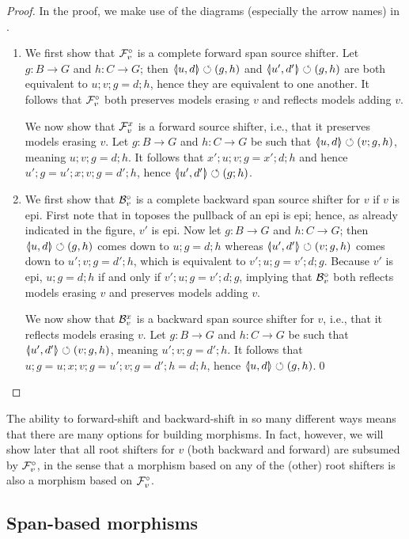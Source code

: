 \begin{proof}
In the proof, we make use of the diagrams (especially the arrow names) in .
\begin{enumerate}
\item We first show that $\mathcal{F}_v^\circ$ is a complete forward span source shifter. Let $g:B\to G$ and $h:C\to G$; then $\spanof{u}{d}\commutes (g,h)$ and $\spanof{u'}{d'}\commutes (g,h)$ are both equivalent to $u;v;g=d;h$, hence they are equivalent to one another. It follows that $\mathcal{F}_v^\circ$ both  preserves models erasing $v$ and reflects models adding $v$.

We now show that $\mathcal{F}_v^x$ is a forward source shifter, i.e., that it preserves models erasing $v$. Let $g:B\to G$ and $h:C\to G$ be such that $\spanof{u}{d}\commutes (v;g,h)$, meaning $u;v;g=d;h$. It follows that $x';u;v;g=x';d;h$ and hence $u';g=u';x;v;g=d';h$, hence $\spanof{u'}{d'}\commutes (g;h)$.

\item We first show that $\mathcal{B}_v^\circ$ is a complete backward span source shifter for $v$ if $v$ is epi. First note that in toposes the pullback of an epi is epi; hence, as already indicated in the figure, $v'$ is epi. Now let $g:B\to G$ and $h:C\to G$; then $\spanof{u}{d}\commutes (g,h)$ comes down to $u;g=d;h$ whereas $\spanof{u'}{d'}\commutes (v;g,h)$ comes down to $u';v;g=d';h$, which is equivalent to $v';u;g=v';d;g$. Because $v'$ is epi, $u;g=d;h$ if and only if $v';u;g=v';d;g$, implying that $\mathcal{B}_v^\circ$ both reflects models erasing $v$ and preserves models adding $v$.

We now show that $\mathcal{B}_v^x$ is a backward span source shifter for $v$, i.e., that it reflects models erasing $v$. Let $g:B\to G$ and $h:C\to G$ be such that $\spanof{u'}{d'}\commutes (v;g,h)$, meaning $u';v;g=d';h$. It follows that $u;g=u;x;v;g=u';v;g=d';h=d;h$, hence $\spanof u d\commutes (g,h)$.\qed
\end{enumerate}
\end{proof}
%
The ability to forward-shift and backward-shift in so many different ways means that there are many options for building morphisms. In fact, however, we will show later that all root shifters for $v$ (both backward and forward) are subsumed by $\mathcal{F}_v^\circ$, in the sense that a morphism based on any of the (other) root shifters is also a morphism based on $\mathcal{F}_v^\circ$.

\subsection{Span-based morphisms}

